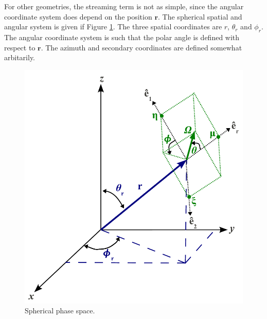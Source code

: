 For other geometries, the streaming term is not as simple, since the angular coordinate system does depend on the position $\mathbf{r}$.  The spherical spatial and angular system is given if Figure \ref{fig:spherical_phase_space}.  The three spatial coordinates are $r$, $\theta_r$ and $\phi_r$.  The angular coordinate system is such that the polar angle is defined with respect to $\mathbf{r}$.  The azimuth and secondary coordinates are defined somewhat arbitarily.

\begin{figure}[ht] 
    \centering
    \includegraphics[keepaspectratio, width = 3.0 in]{images/spherical_phase_space}
    \caption{Spherical phase space.}
    \label{fig:spherical_phase_space}
\end{figure}

